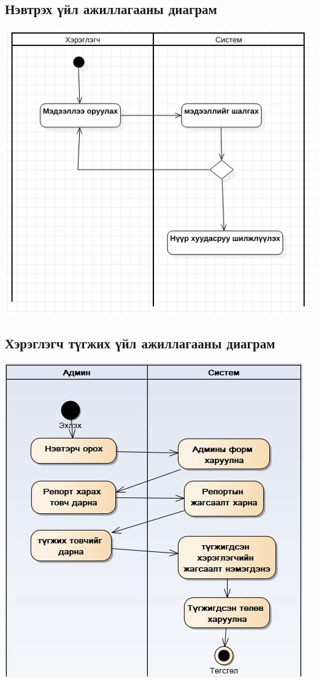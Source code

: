 \documentclass[
oneside, %
english, %
onehalfspacing, %
nolistspacing, %
headsepline, %
]{article} %
\begin{document}
     	\subsection{Нэвтрэх үйл ажиллагааны диаграм}
     	\includegraphics[width=\textwidth]{loginActivity}
     	\subsection{Хэрэглэгч түгжих үйл ажиллагааны диаграм}
     \includegraphics[width=\textwidth]{tugjihActivity}
\end{document}
